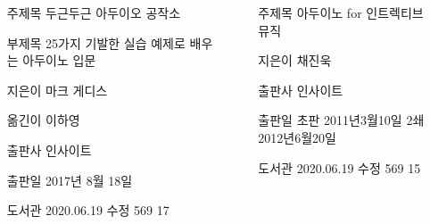 \documentclass[20pt, a1paper ]{tikzposter}
\begin{document}
\begin{columns}
			{				
			\setlength{\leftmargini}{9em}			
			\setlength{\labelsep}{1em} %

			\begin{LARGE}
			\begin{itemize}
			\item [주제목] 두근두근 아두이오 공작소 
			\item [부제목] 25가지 기발한 실습 예제로 배우는 아두이노 입문
			\item [지은이] 마크 게디스
			\item [옮긴이] 이하영
			\item [출판사] 인사이트
			\item [출판일] 2017년 8월 18일
			\item [도서관] 2020.06.19 수정 569 17

			\end{itemize}
			\end{LARGE}
		}


			{				
			\setlength{\leftmargini}{9em}			
			\setlength{\labelsep}{1em} %

			\begin{LARGE}
			\begin{itemize}
			\item [주제목] 아두이노 for 인트렉티브 뮤직 
			\item [지은이] 채진욱
			\item [출판사] 인사이트
			\item [출판일] 초판 2011년3월10일 2쇄 2012년6월20일
			\item [도서관] 2020.06.19 수정 569 15

			\end{itemize}
			\end{LARGE}
		}


	\end{columns}
\end{document}
